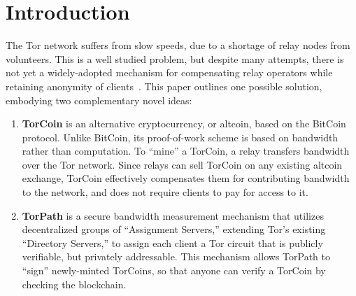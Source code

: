 \section{Introduction}

The Tor network suffers from slow speeds, due to a shortage of relay nodes from
volunteers. This is a well studied problem, but despite many attempts, there is
not yet a widely-adopted mechanism for compensating relay operators while
retaining anonymity of clients~\cite{raykova- pet2008, wpes09-xpay,
incentives-fc10, ccs10-braids, acsac11-tortoise, jansen2013lira,
johnson2013onions}.
This paper outlines one possible solution, embodying two complementary
novel ideas:

\begin{enumerate}

\item
\textbf{TorCoin} is an alternative cryptocurrency, or
altcoin, based on the BitCoin protocol\cite{nakamoto2008bitcoin}. Unlike
BitCoin, its proof-of-work scheme is based on bandwidth rather than
computation. To ``mine''  a TorCoin, a relay transfers bandwidth
over the Tor network. Since relays can sell  TorCoin on any existing altcoin
exchange, TorCoin effectively compensates them for  contributing bandwidth to
the network, and does not require clients to pay for  access to it.
\\
\item
\textbf{TorPath} is a secure bandwidth measurement mechanism
that utilizes decentralized groups of ``Assignment Servers,''
extending Tor's existing ``Directory Servers,'' to assign each client a Tor
circuit that is publicly verifiable, but privately addressable. This mechanism 
allows TorPath to ``sign'' newly-minted TorCoins, so that anyone can verify a
TorCoin by checking the blockchain. \end{enumerate}


